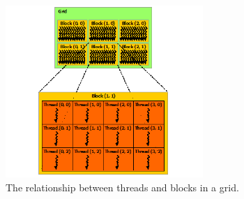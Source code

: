 \begin{figure}[ht!]
\centering
\includegraphics[width=75mm]{../gfx/blocks_and_threads.png}
\caption{The relationship between threads and blocks in a grid\cite{cuda_programming_guide}.}
\label{fig:thread_block}
\end{figure}

\cleardoublepage
